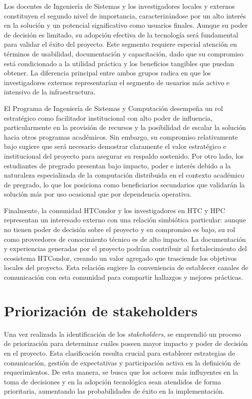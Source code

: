 Los docentes de Ingeniería de Sistemas y los investigadores locales y externos constituyen el segundo nivel de importancia, caracterizándose por un alto interés en la solución y un potencial significativo como usuarios finales. Aunque su poder de decisión es limitado, su adopción efectiva de la tecnología será fundamental para validar el éxito del proyecto. Este segmento requiere especial atención en términos de usabilidad, documentación y capacitación, dado que su compromiso está condicionado a la utilidad práctica y los beneficios tangibles que puedan obtener. La diferencia principal entre ambos grupos radica en que los investigadores externos representarían el segmento de usuarios más activo e intensivo de la infraestructura.

El Programa de Ingeniería de Sistemas y Computación desempeña un rol estratégico como facilitador institucional con alto poder de influencia, particularmente en la provisión de recursos y la posibilidad de escalar la solución hacia otros programas académicos. Sin embargo, su compromiso relativamente bajo sugiere que será necesario demostrar claramente el valor estratégico e institucional del proyecto para asegurar su respaldo sostenido. Por otro lado, los estudiantes de pregrado presentan bajo impacto, poder e interés debido a la naturaleza especializada de la computación distribuida en el contexto académico de pregrado, lo que los posiciona como beneficiarios secundarios que validarán la solución más por uso ocasional que por dependencia operativa.

Finalmente, la comunidad HTCondor y los investigadores en HTC y HPC representan un interesado externo con una relación simbiótica particular: aunque no tienen poder de decisión sobre el proyecto y su compromiso es bajo, su rol como proveedores de conocimiento técnico es de alto impacto. La documentación y experiencias generadas por el proyecto podrían contribuir al fortalecimiento del ecosistema HTCondor, creando un valor agregado que trasciende los objetivos locales del proyecto. Esta relación sugiere la conveniencia de establecer canales de comunicación con esta comunidad para compartir hallazgos y mejores prácticas.



\section{Priorización de stakeholders}
Una vez realizada la identificación de los \textit{stakeholders}, se emprendió un proceso de priorización para determinar cuáles poseen mayor impacto y poder de decisión en el proyecto. Esta clasificación resulta crucial para establecer estrategias de comunicación, gestión de expectativas y participación activa en la definición de requerimientos. De esta manera, se busca que los actores más influyentes en la toma de decisiones y en la adopción tecnológica sean atendidos de forma prioritaria, aumentando las probabilidades de éxito en la implementación.

